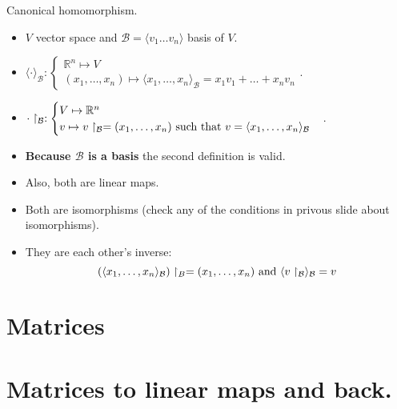 \documentclass{beamer}
\begin{document}
\begin{frame}{Canonical homomorphism.}
  \begin{itemize}
  \item $V$ vector space and $\mathcal{B} = \langle v_1 \dots v_n \rangle$ basis of $V$. 
  \end{itemize}

  \begin{definition}
    \begin{itemize}
    \item $\langle \cdot \rangle_{\mathcal{B}}: \begin{cases} \mathbb{R}^n \mapsto V \\ (x_1, \dots, x_n) \mapsto \langle x_1,\dots, x_n \rangle_{\mathcal{B}} = x_1 v_1 + \dots + x_n v_n  \end{cases}$.
    \item $\cdot \restriction_{\mathcal{B}}: \begin{cases} V \mapsto \mathbb{R}^n \\ v \mapsto v \restriction_{\mathcal{B}} = (x_1, \dots, x_n) \textnormal{ such that } v = \langle x_1, \dots, x_n \rangle_{\mathcal{B}} \end{cases}$.
    \end{itemize}
  \end{definition}

  \begin{itemize}
  \item {\bf Because $\mathcal{B}$ is a basis} the second definition is valid.
  \item Also, both are linear maps.
  \item Both are isomorphisms (check any of the conditions in privous slide about isomorphisms).
  \item They are each other's inverse:
    \[
   (\langle x_1, \dots, x_n\rangle_{\mathcal{B}})\restriction_{B} = (x_1, \dots, x_n)
    \textnormal{ and }\langle v \restriction_{\mathcal{B}} \rangle_{\mathcal{B}} = v
    \]
  \end{itemize}
\end{frame}


\section{Matrices}


\section{Matrices to linear maps and back.}
\end{document}
